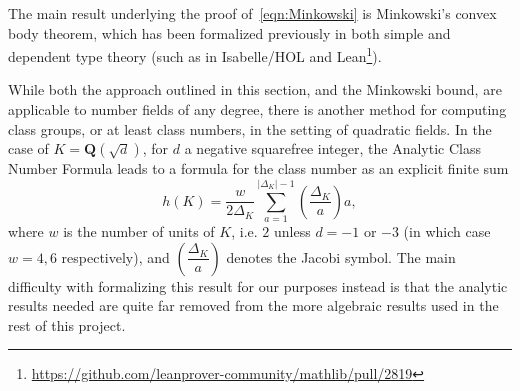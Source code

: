 \documentclass[sigplan,10pt,nonacm,
screen]{acmart} \settopmatter{printfolios=true,printccs=false,printacmref=false}
\newcommand{\sd}[1]{\todo[color=yellow]{SD: #1}}
\newcommand{\QQ}{\mathbf{Q}}
\newcommand{\ZZ}{\mathbf{Z}}
\DeclareMathOperator{\SL}{SL}
\DeclareMathOperator{\PSL}{PSL}
\begin{document}
The main result underlying the proof of~\eqref{eqn:Minkowski} is Minkowski's convex body theorem, which has been formalized previously in both simple and dependent type theory (such as in Isabelle/HOL \cite{Minkowskis_Theorem-AFP} and Lean\footnote{\url{https://github.com/leanprover-community/mathlib/pull/2819}}).

While both the approach outlined in this section, and the Minkowski bound, are applicable to number fields of any degree, there is another method for computing class groups, or at least class numbers, in the setting of quadratic fields. In the case of $K=\QQ(\sqrt{d})$, for $d$ a negative squarefree integer, the Analytic Class Number Formula \cite[Section VII.5]{Neukirch} leads to a formula for the class number as an explicit finite sum
\begin{equation*}
h(K) = \dfrac{w}{2\Delta_K} \sum_{a=1}^{|\Delta_K|-1} \left(\dfrac{\Delta_K}{a}\right) a,
\end{equation*}
where $w$ is the number of units of $K$, i.e. $2$ unless $d=-1$ or $-3$ (in which case $w=4,6$ respectively), and $\left(\dfrac{\Delta_K}{a}\right)$ denotes the Jacobi symbol.
The main difficulty with formalizing this result for our purposes instead is that the analytic results needed are quite far removed from the more algebraic results used in the rest of this project.

%
\end{document}
